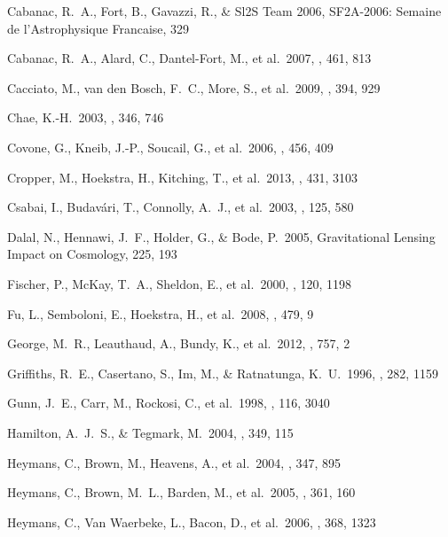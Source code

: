 \documentclass[apj]{emulateapj}
\begin{document}
\begin{thebibliography}{}
  Cabanac, R.~A., Fort,
  B., Gavazzi, R., \& Sl2S Team 2006, SF2A-2006: Semaine de l'Astrophysique Francaise, 329


  Cabanac,
  R.~A., Alard, C., Dantel-Fort, M., et al.\ 2007, \aap, 461, 813

  Cacciato, M., van den
  Bosch, F.~C., More, S., et al.\ 2009, \mnras, 394, 929

  Chae, K.-H.\ 2003, \mnras, 346,
   746

  Covone, G.,
  Kneib, J.-P., Soucail, G., et al.\ 2006, \aap, 456, 409

 Cropper, M., Hoekstra,
H., Kitching, T., et al.\ 2013, \mnras, 431, 3103


  Csabai, I.,
   Budav{\'a}ri, T., Connolly, A.~J., et al.\ 2003, \aj, 125, 580

  Dalal, N., Hennawi,
  J.~F., Holder, G., \& Bode, P.\ 2005, Gravitational Lensing Impact on Cosmology, 225, 193

  Fischer, P., McKay,
T.~A., Sheldon, E., et al.\ 2000, \aj, 120, 1198

  Fu, L.,
  Semboloni, E., Hoekstra, H., et al.\ 2008, \aap, 479, 9

  George, M.~R.,
  Leauthaud, A., Bundy, K., et al.\ 2012, \apj, 757, 2

  Griffiths, R.~E.,
  Casertano, S., Im, M., \& Ratnatunga, K.~U.\ 1996, \mnras, 282, 1159

  Gunn, J.~E., Carr, M.,
  Rockosi, C., et al.\ 1998, \aj, 116, 3040

 Hamilton, A.~J.~S., \& Tegmark, M.\ 2004, \mnras, 349, 115

  Heymans, C., Brown, M.,
  Heavens, A., et al.\ 2004, \mnras, 347, 895

  Heymans, C., Brown,
  M.~L., Barden, M., et al.\ 2005, \mnras, 361, 160

   Heymans, C., Van
Waerbeke, L., Bacon, D., et al.\ 2006, \mnras, 368, 1323


\end{thebibliography}
\end{document}
